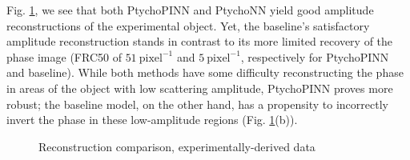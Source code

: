 \documentclass[sn-mathphys]{sn-jnl}%
\theoremstyle{thmstyleone}%
\theoremstyle{thmstyletwo}%
\theoremstyle{thmstylethree}%
\begin{document}
Fig. \ref{fig:exp_comparison_detailed}, we see that both PtychoPINN and PtychoNN yield good amplitude reconstructions of the experimental object. Yet, the baseline's satisfactory amplitude reconstruction stands in contrast to its more limited recovery of the phase image (FRC50 of $51~\mathrm{pixel}^{-1}$ and $5~\mathrm{pixel}^{-1}$, respectively for PtychoPINN and baseline). While both methods have some difficulty reconstructing the phase in areas of the object with low scattering amplitude, PtychoPINN proves more robust; the baseline model, on the other hand, has a propensity to incorrectly invert the phase in these low-amplitude regions (Fig. \ref{fig:exp_comparison_detailed}(b)).


\begin{figure}%
    \centering
\vfill
    \caption{Reconstruction comparison, experimentally-derived data}%
    \label{fig:exp_comparison_detailed}%
\end{figure}
\end{document}
